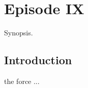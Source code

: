 \chapter{Episode IX}
	\label{chapter:episode9}%



\begin{synopsis}
	Synopsis.
\end{synopsis}


\section{Introduction}

 the force ...

